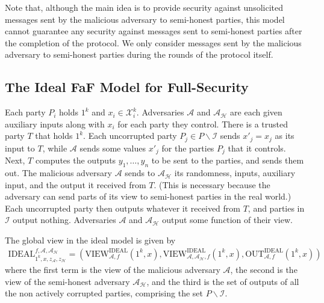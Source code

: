 \documentclass[11pt, a4paper]{article}
\theoremstyle{definition}
\theoremstyle{remark}
\begin{document}
Note that, although the main idea is to provide security against unsolicited messages sent by the malicious adversary to semi-honest parties, this model cannot guarantee any security against messages sent to semi-honest parties after the completion of the protocol. We only consider messages sent by the malicious adversary to semi-honest parties during the rounds of the protocol itself.

\subsection{The Ideal FaF Model for Full-Security}

Each party $P_i$ holds $1^k$ and $x_i\in\mathcal{X}_{i}^{k}$. Adversaries $\mathcal{A}$ and $\mathcal{A}_{\mathcal{H}}$ are each given auxiliary inputs along with $x_i$ for each party they control. There is a trusted party $T$ that holds $1^k$. Each uncorrupted party $P_j\in P\backslash\mathcal{I}$ sends $x'_j = x_j$ as its input to $T$, while $\mathcal{A}$ sends some values $x'_j$ for the parties $P_j$ that it controls. Next, $T$ computes the outputs $y_1,\dots,y_n$ to be sent to the parties, and sends them out. The malicious adversary $\mathcal{A}$ sends to $\mathcal{A}_{\mathcal{H}}$ its randomness, inputs, auxiliary input, and the output it received from $T$. (This is necessary because the adversary can send parts of its view to semi-honest parties in the real world.) Each uncorrupted party then outputs whatever it received from $T$, and parties in $\mathcal{I}$ output nothing. Adversaries $\mathcal{A}$ and $\mathcal{A}_{\mathcal{H}}$ output some function of their view.

\medskip

The global view in the ideal model is given by
\begin{align*}
    \text{IDEAL}_{1^k,x,z_{\mathcal{A}},z_{\mathcal{H}}}^{f,\mathcal{A},\mathcal{A}_\mathcal{H}} = \left(\text{VIEW}^{\text{IDEAL}}_{\mathcal{A},f}(1^k,x), \text{VIEW}^{\text{IDEAL}}_{\mathcal{A},\mathcal{A}_{\mathcal{H}}, f}(1^k,x), \text{OUT}^{\text{IDEAL}}_{\mathcal{A},f}(1^k,x)\right)
\end{align*}
where the first term is the view of the malicious adversary $\mathcal{A}$, the second is the view of the semi-honest adversary $\mathcal{A}_{\mathcal{H}}$, and the third is the set of outputs of all the non actively corrupted parties, comprising the set $P\backslash\mathcal{I}$.
\end{document}
